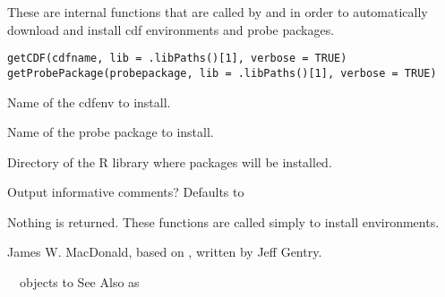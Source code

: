 \begin{Description}\relax
These are internal functions that are called by  and
 in order to automatically download and install cdf
environments and probe packages.
\end{Description}
\begin{Usage}
\begin{verbatim}
getCDF(cdfname, lib = .libPaths()[1], verbose = TRUE)
getProbePackage(probepackage, lib = .libPaths()[1], verbose = TRUE)
\end{verbatim}
\end{Usage}
\begin{Arguments}
\begin{ldescription}
\item[\code{cdfname}] Name of the cdfenv to install. 
\item[\code{probepackage}] Name of the probe package to install. 
\item[\code{lib}] Directory of the R library where packages will be installed. 
\item[\code{verbose}] Output informative comments? Defaults to 
\end{ldescription}
\end{Arguments}
\begin{Value}
Nothing is returned. These functions are called simply to install environments.
\end{Value}
\begin{Author}\relax
James W. MacDonald, based on , written by Jeff
Gentry.
\end{Author}
\begin{SeeAlso}\relax
~~objects to See Also as 
\end{SeeAlso}

